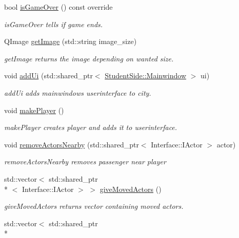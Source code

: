 \begin{DoxyCompactItemize}
bool \hyperlink{class_student_side_1_1_city_a9ca889641234d84e92fa97b999ae1ee4}{is\-Game\-Over} () const override
\begin{DoxyCompactList}\small\item\em is\-Game\-Over tells if game ends. \end{DoxyCompactList}\item 
Q\-Image \hyperlink{class_student_side_1_1_city_ab3ac8687f8213b2a26484214a7925dc2}{get\-Image} (std\-::string image\-\_\-size)
\begin{DoxyCompactList}\small\item\em get\-Image returns the image depending on wanted size. \end{DoxyCompactList}\item 
void \hyperlink{class_student_side_1_1_city_a5d7dffa807359354d94bd031fb207767}{add\-Ui} (std\-::shared\-\_\-ptr$<$ \hyperlink{class_student_side_1_1_mainwindow}{Student\-Side\-::\-Mainwindow} $>$ ui)
\begin{DoxyCompactList}\small\item\em add\-Ui adds mainwindows userinterface to city. \end{DoxyCompactList}\item 
void \hyperlink{class_student_side_1_1_city_a9e77dd00ce37d3467bb078d0fb7b3cca}{make\-Player} ()
\begin{DoxyCompactList}\small\item\em make\-Player creates player and adds it to userinterface. \end{DoxyCompactList}\item 
void \hyperlink{class_student_side_1_1_city_a7eda95e6a13b21826908b65f73cfeab5}{remove\-Actors\-Nearby} (std\-::shared\-\_\-ptr$<$ Interface\-::\-I\-Actor $>$ actor)
\begin{DoxyCompactList}\small\item\em remove\-Actors\-Nearby removes passenger near player \end{DoxyCompactList}\item 
std\-::vector$<$ std\-::shared\-\_\-ptr\\*
$<$ Interface\-::\-I\-Actor $>$ $>$ \hyperlink{class_student_side_1_1_city_ab12fa6213daf693fc5602317c04c363c}{give\-Moved\-Actors} ()
\begin{DoxyCompactList}\small\item\em give\-Moved\-Actors returns vector containing moved actors. \end{DoxyCompactList}\item 
std\-::vector$<$ std\-::shared\-\_\-ptr\\*

\end{DoxyCompactItemize}
